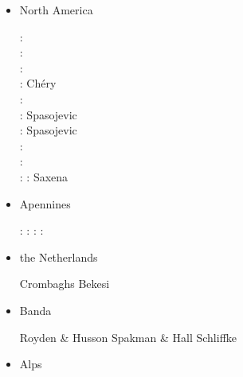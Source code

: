 \begin{itemize}
\item North America 

\begin{scriptsize}
\nineteenseventythree: \cite{sabu73}\\
\nineteenninety: \cite{huha90}\\
\nineteenninetyseven: \cite{bugm97}\\
\twothousandone: Ch\'ery \etal \cite{chzh01} \\
\twothousandsix: \cite{besb06}\\
\twothousandeight: Spasojevic \etal \cite{splg08}\\
\twothousandnine: Spasojevic \etal \cite{splg09}\\
\twothousandtwelve: \cite{beck12}\\
\twothousandthirteen: \cite{ghbh13}\cite{simi13}\\
\twothousandfifteen: \cite{riag15}
\twothousandtwentyone: Saxena \etal \cite{sacp21}
\end{scriptsize}

\item Apennines 

\begin{scriptsize}
\nineteenninetyeight: \cite{buwg98}
\twothousandseven: \cite{shpy07}
\twothousandnine: \cite{rohu09}
\twothousandfifteen: \cite{vami15}
\end{scriptsize}

\item the Netherlands 

\begin{scriptsize}
\twothousandtwo Crombaghs \etal \cite{crdv02}
\twothousandtwenty Bekesi \etal \cite{besb20}
\end{scriptsize}



\item Banda 

\begin{scriptsize}
Royden \& Husson \cite{rohu09}
Spakman \& Hall \cite{spha10}
Schliffke \etal \cite{scvg21}
\end{scriptsize}


\item Alps 


\end{itemize}
